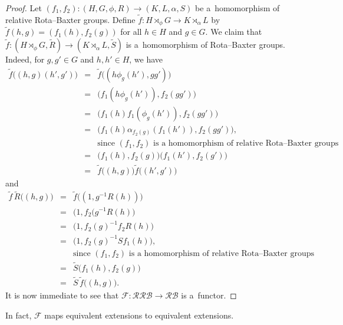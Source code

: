 \documentclass{jonasart}
\theoremstyle{plain}
\begin{document}
	\begin{proof}
		Let $(f_1, f_2 ): (H,G,\phi,R) \to (K,L,\alpha,S)$ be a~homomorphism of relative Rota--Baxter groups. Define $\widetilde{f}:H\rtimes_{\phi} G \to K\rtimes_{\alpha} L$ by
		$\widetilde{f}(h,g)=(f_1 (h),f_2 (g))$ for all $h \in H$ and $g \in G$. We claim that $\widetilde{f}:(H\rtimes_{\phi} G, \widetilde{R})\to (K\rtimes_{\alpha}L, \widetilde{S})$ is a~homomorphism of Rota--Baxter groups. Indeed, for $g, g' \in G$ and $h, h' \in H$, we have
		\begin{eqnarray*}
			\widetilde{f}\big((h,g)(h',g')\big)&=&\widetilde{f}\big((h\phi_g (h'),gg')\big)\\
			&=&\big(f_1 (h\phi_g (h')),f_2 (gg')\big)\\
			&=& \big(f_1 (h)f_1 (\phi_g (h')),f_2 (gg') \big)\\
			&=& \big(f_1 (h)\alpha_{f_2 (g)}(f_1 (h')),f_2 (gg') \big),\\
			&& \text{since $(f_1,f_2 )$ is a~homomorphism of relative Rota--Baxter groups}\\
			&=&\big(f_1 (h),f_2 (g)\big)\big(f_1 (h'),f_2 (g')\big)\\
			&=& \widetilde{f} \big((h,g)\big) \widetilde{f} \big((h',g')\big)
		\end{eqnarray*}
		and
		\begin{eqnarray*}
			\widetilde{f}\, \widetilde{R}\big((h,g)\big)&=&\widetilde{f} \big((1,g^{-1}R(h)) \big)\\
			&=& \big(1,f_2 (g^{-1}R(h) \big)\\
			&=& \big(1,f_2 (g)^{-1}f_2 R(h) \big)\\
			&=& \big(1,f_2 (g)^{-1}S f_1 (h)\big),\\
			&& \text{since $(f_1,f_2 )$ is a~homomorphism of relative Rota--Baxter groups}\\
			&=&\widetilde{S} \big(f_1 (h),f_2 (g) \big)\\
			&=&\widetilde{S} \, \widetilde{f} \big((h,g)\big).
		\end{eqnarray*}
		It is now immediate to see that $\mathcal{F}: \mathcal{RRB} \to \mathcal{RB}$ is a~functor.
	\end{proof}
	
	In fact, $\mathcal{F}$ maps equivalent extensions to equivalent extensions.
	
\end{document}
